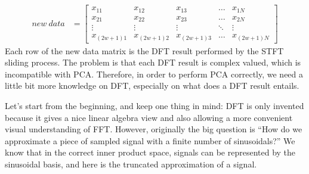 \documentclass{article}
\begin{document}
\begin{align}
    new\:data &= \begin{bmatrix}
            x_{11} & x_{12} & x_{13} & \dots  & x_{1N} \\
   		   x_{21} & x_{22} & x_{23} & \dots  & x_{2N} \\
            \vdots & \vdots & \vdots & \ddots & \vdots \\
            x_{(2w+1)1} & x_{(2w+1)2} & x_{(2w+1)3} & \dots  & x_{(2w+1)N}
         \end{bmatrix}
  \end{align}
Each row of the new data matrix is the DFT result performed by the STFT sliding process. The problem is that each DFT result is complex valued, which is incompatible with PCA. Therefore, in order to perform PCA correctly, we need a little bit more knowledge on DFT, especially on what does a DFT result entails.

Let's start from the beginning, and keep one thing in mind: DFT is only invented because it gives a nice linear algebra view and also allowing a more convenient visual understanding of FFT. However, originally the big question is “How do we approximate a piece of sampled signal with a finite number of sinusoidals?”
We know that in the correct inner product space, signals can be represented by the sinusoidal basis, and here is the truncated approximation of a signal. 
\end{document}
